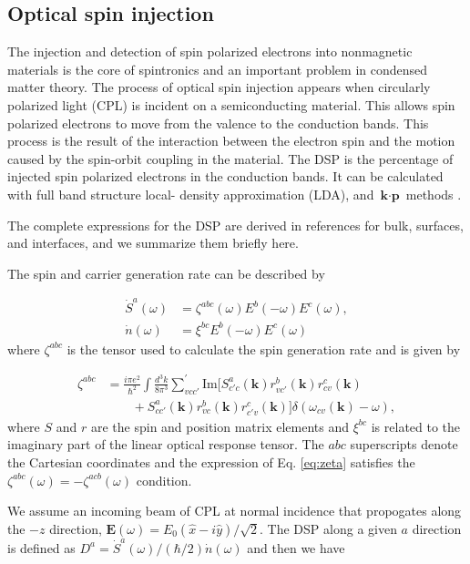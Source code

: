 \documentclass[pss]{wiley2sp} %
\begin{document}
\subsection{Optical spin injection}

The injection and detection of spin polarized electrons into nonmagnetic
materials is the core of spintronics \cite{vzutic2004spintronics,%
fert2008nobel,pezzoli2012optical,bottegoni2013experimental,%
bottegoni2013photoinduced} and an important problem in condensed matter
theory. The process of optical spin injection appears when circularly
polarized light (CPL) \cite{dyakonov1984theory} is incident on a
semiconducting material. This allows spin polarized electrons to move from the
valence to the conduction bands. This process is the result of the interaction
between the electron spin and the motion caused by the spin-orbit coupling in
the material. The DSP is the percentage of injected spin polarized electrons
in the conduction bands. It can be calculated with full band structure local-
density approximation (LDA), and $\textbf{k}\cdot\textbf{p}$ methods
\cite{nastos2007full,cabellos2009stress}.

The complete expressions for the DSP are derived in references
\cite{nastos2007full,mendoza2012optical} for bulk, surfaces, and interfaces, 
and we summarize them briefly here. 

The spin and carrier generation rate can be described by 

\begin{changed}
\begin{align*}
\dot{S}^{a}(\omega) &= \zeta^{abc}(\omega)E^{b}(-\omega)E^{c}(\omega), \nonumber \\ 
\dot{n}(\omega)     &= \xi^{bc}E^{b}(-\omega)E^{c}(\omega)
\end{align*}
where $\zeta^{abc}$ is the tensor used to calculate the spin generation 
rate and is given by

\begin{align}\label{eq:zeta}
\zeta^{abc} &= \frac{i\pi e^{2}}{\hbar^{2}}\int\frac{d^{3}k}{8\pi^{3}}
\sum_{vcc'}^{\prime}\text{Im}\bigl[S^{a}_{c'c}(\textbf{k})
r^{b}_{vc'}(\textbf{k})r^{c}_{cv}(\textbf{k})\nonumber\\
&\qquad+S^{a}_{cc'}(\textbf{k})
r^{b}_{vc}(\textbf{k})r^{c}_{c'v}(\textbf{k})\bigr]
\delta(\omega_{cv}(\textbf{k})-\omega),
\end{align}
where $S$ and $r$ are the spin and position matrix elements and $\xi^{bc}$ is related to the imaginary part of the linear optical response tensor. The $abc$ superscripts denote the Cartesian coordinates and the expression of Eq. \eqref{eq:zeta} satisfies the $\zeta^{abc}(\omega) = -\zeta^{acb}(\omega)$ condition.

We assume an incoming beam of CPL at normal incidence that propogates along the $-z$ direction, $\mathbf{E}(\omega) = E_{0}(\hat{x} - i\hat{y})/\sqrt{2}$. The DSP along a given $a$ direction is defined as $D^{a}=\dot{S}^{a}(\omega)/(\hbar/2)\dot{n}(\omega)$ and then we have
\end{changed}
\end{document}
